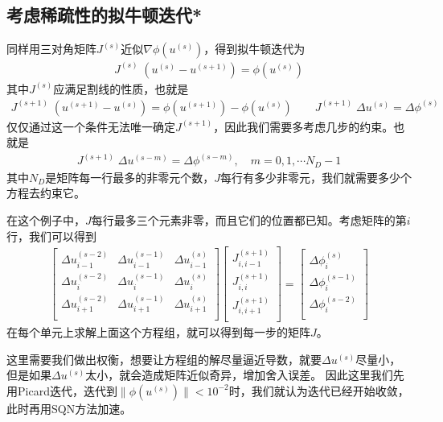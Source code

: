 \documentclass[12pt,a4paper]{article}
\begin{document}
\subsection*{考虑稀疏性的拟牛顿迭代*}

同样用三对角矩阵$J^{(s)}$近似$\nabla \phi(u^{(s)})$，得到拟牛顿迭代为
\begin{align*}
J^{(s)} \; (u^{(s)} - u^{(s+1)}) = \phi(u^{(s)})
\end{align*}
其中$J^{(s)}$应满足割线的性质，也就是
\begin{align*}
J^{(s+1)} \; (u^{(s+1)} - u^{(s)}) = \phi(u^{(s+1)}) - \phi(u^{(s)}) \qquad J^{(s+1)} \; \Delta u^{(s)} = \Delta \phi^{(s)}
\end{align*}
仅仅通过这一个条件无法唯一确定$J^{(s+1)}$，因此我们需要多考虑几步的约束。也就是
\begin{align*}
J^{(s+1)} \; \Delta u^{(s-m)} = \Delta \phi^{(s-m)}, \quad m = 0, 1, \cdots N_D-1
\end{align*}
其中$N_D$是矩阵每一行最多的非零元个数，$J$每行有多少非零元，我们就需要多少个方程去约束它。

在这个例子中，$J$每行最多三个元素非零，而且它们的位置都已知。考虑矩阵的第$i$行，我们可以得到
\begin{align*}
\left[
\begin{array}{ccc}
\Delta u^{(s-2)}_{i-1} & \Delta u^{(s-1)}_{i-1} & \Delta u^{(s)}_{i-1} \\
\Delta u^{(s-2)}_{i} & \Delta u^{(s-1)}_{i} & \Delta u^{(s)}_{i} \\
\Delta u^{(s-2)}_{i+1} & \Delta u^{(s-1)}_{i+1} & \Delta u^{(s)}_{i+1} \\
\end{array}
\right]
\left[
\begin{array}{c}
J^{(s+1)}_{i,i-1} \\
J^{(s+1)}_{i,i} \\
J^{(s+1)}_{i,i+1} \\
\end{array}
\right]
=
\left[
\begin{array}{c}
\Delta \phi^{(s)}_{i} \\
\Delta \phi^{(s-1)}_{i} \\
\Delta \phi^{(s-2)}_{i} \\
\end{array}
\right]
\end{align*}
在每个单元上求解上面这个方程组，就可以得到每一步的矩阵$J$。

这里需要我们做出权衡，想要让方程组的解尽量逼近导数，就要$\Delta u^{(s)}$尽量小，但是如果$\Delta u^{(s)}$太小，就会造成矩阵近似奇异，增加舍入误差。
因此这里我们先用Picard迭代，迭代到$\|\phi(u^{(s)})\| < 10^{-2}$时，我们就认为迭代已经开始收敛，此时再用SQN方法加速。
\end{document}
